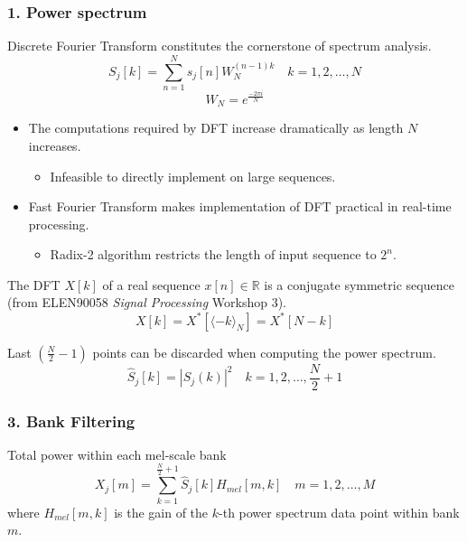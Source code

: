 
\begin{frame}
\frametitle{1. Power spectrum}

Discrete Fourier Transform constitutes the cornerstone of spectrum analysis.
\begin{equation}
S_j[k] = \sum_{n=1}^{N} s_j[n] W_N^{(n-1) k} \quad k = 1, 2, \dots, N
\end{equation}
\begin{equation}
W_N = e^{\frac{- 2\pi i}{N}}
\end{equation}

\begin{itemize}
	\item The computations required by DFT increase dramatically as length $N$ increases.
	\begin{itemize}
		\item Infeasible to directly implement on large sequences.
	\end{itemize}
	\item Fast Fourier Transform makes implementation of DFT practical in real-time processing.
	\begin{itemize}
		\item Radix-2 algorithm restricts the length of input sequence to $2^n$.
	\end{itemize}
\end{itemize}
\end{frame}


\begin{frame}
The DFT $X[k]$ of a real sequence $x[n] \in \mathbb{R}$ is a conjugate symmetric sequence (from ELEN90058 \textit{Signal Processing} Workshop 3).
\begin{equation}
X[k] = X^*[\langle-k\rangle_{N}] = X^*[N-k]
\end{equation}

Last $(\frac{N}{2} - 1)$ points can be discarded when computing the power spectrum.
\begin{equation}
\hat{S}_j[k] = |S_j(k)|^2 \quad k = 1, 2, \dots, \frac{N}{2} + 1
\end{equation}
\end{frame}


\begin{frame}
\frametitle{3. Bank Filtering}
Total power within each mel-scale bank
\begin{equation}
X_j[m] = \sum^{\frac{N}{2} + 1}_{k=1} \hat{S}_j[k] H_{mel}[m, k] \quad m = 1, 2, \dots, M
\end{equation}
where $H_{mel}[m, k]$ is the gain of the $k$-th power spectrum data point within bank $m$.
\end{frame}

